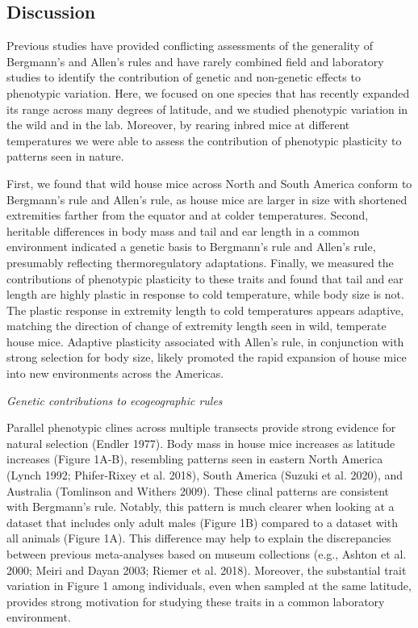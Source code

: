 \documentclass[
]{article}
\begin{document}
\vspace{5mm}

\hypertarget{discussion}{%
\subsection{Discussion}\label{discussion}}

Previous studies have provided conflicting assessments of the generality
of Bergmann's and Allen's rules and have rarely combined field and
laboratory studies to identify the contribution of genetic and
non-genetic effects to phenotypic variation. Here, we focused on one
species that has recently expanded its range across many degrees of
latitude, and we studied phenotypic variation in the wild and in the
lab. Moreover, by rearing inbred mice at different temperatures we were
able to assess the contribution of phenotypic plasticity to patterns
seen in nature.

First, we found that wild house mice across North and South America
conform to Bergmann's rule and Allen's rule, as house mice are larger in
size with shortened extremities farther from the equator and at colder
temperatures. Second, heritable differences in body mass and tail and
ear length in a common environment indicated a genetic basis to
Bergmann's rule and Allen's rule, presumably reflecting thermoregulatory
adaptations. Finally, we measured the contributions of phenotypic
plasticity to these traits and found that tail and ear length are highly
plastic in response to cold temperature, while body size is not. The
plastic response in extremity length to cold temperatures appears
adaptive, matching the direction of change of extremity length seen in
wild, temperate house mice. Adaptive plasticity associated with Allen's
rule, in conjunction with strong selection for body size, likely
promoted the rapid expansion of house mice into new environments across
the Americas.

\vspace{3.5mm}

\noindent\emph{Genetic contributions to ecogeographic rules}

Parallel phenotypic clines across multiple transects provide strong
evidence for natural selection (Endler 1977). Body mass in house mice
increases as latitude increases (Figure 1A-B), resembling patterns seen
in eastern North America (Lynch 1992; Phifer-Rixey et al. 2018), South
America (Suzuki et al. 2020), and Australia (Tomlinson and Withers
2009). These clinal patterns are consistent with Bergmann's rule.
Notably, this pattern is much clearer when looking at a dataset that
includes only adult males (Figure 1B) compared to a dataset with all
animals (Figure 1A). This difference may help to explain the
discrepancies between previous meta-analyses based on museum collections
(e.g., Ashton et al. 2000; Meiri and Dayan 2003; Riemer et al. 2018).
Moreover, the substantial trait variation in Figure 1 among individuals,
even when sampled at the same latitude, provides strong motivation for
studying these traits in a common laboratory environment.
\end{document}
